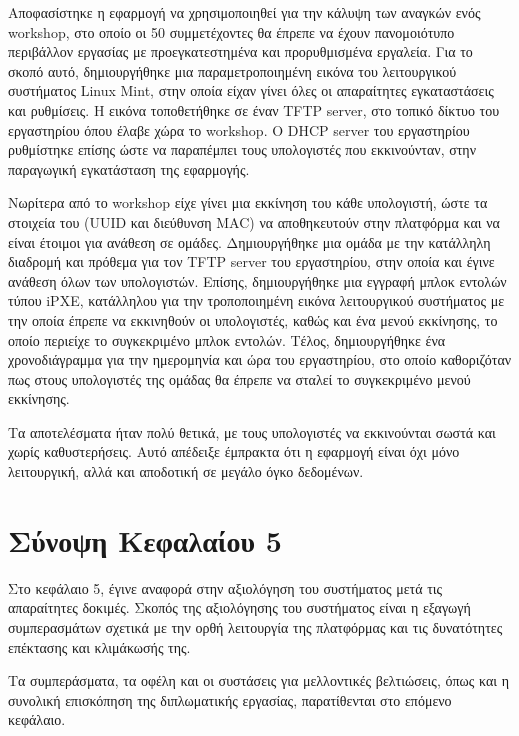 Αποφασίστηκε η εφαρμογή να χρησιμοποιηθεί για την κάλυψη των αναγκών ενός workshop, στο οποίο οι 50 συμμετέχοντες θα έπρεπε να έχουν πανομοιότυπο περιβάλλον εργασίας με προεγκατεστημένα και προρυθμισμένα εργαλεία. Για το σκοπό αυτό, δημιουργήθηκε μια παραμετροποιημένη εικόνα του λειτουργικού συστήματος Linux Mint, στην οποία είχαν γίνει όλες οι απαραίτητες εγκαταστάσεις και ρυθμίσεις. Η εικόνα τοποθετήθηκε σε έναν TFTP server, στο τοπικό δίκτυο του εργαστηρίου όπου έλαβε χώρα το workshop. Ο DHCP server του εργαστηρίου ρυθμίστηκε επίσης ώστε να παραπέμπει τους υπολογιστές που εκκινούνταν, στην παραγωγική εγκατάσταση της εφαρμογής.

Νωρίτερα από το workshop είχε γίνει μια εκκίνηση του κάθε υπολογιστή, ώστε τα στοιχεία του (UUID και διεύθυνση MAC) να αποθηκευτούν στην πλατφόρμα και να είναι έτοιμοι για ανάθεση σε ομάδες. Δημιουργήθηκε μια ομάδα με την κατάλληλη διαδρομή και πρόθεμα για τον TFTP server του εργαστηρίου, στην οποία και έγινε ανάθεση όλων των υπολογιστών. Επίσης, δημιουργήθηκε μια εγγραφή μπλοκ εντολών τύπου iPXE, κατάλληλου για την τροποποιημένη εικόνα λειτουργικού συστήματος με την οποία έπρεπε να εκκινηθούν οι υπολογιστές, καθώς και ένα μενού εκκίνησης, το οποίο περιείχε το συγκεκριμένο μπλοκ εντολών. Τέλος, δημιουργήθηκε ένα χρονοδιάγραμμα για την ημερομηνία και ώρα του εργαστηρίου, στο οποίο καθοριζόταν πως στους υπολογιστές της ομάδας θα έπρεπε να σταλεί το συγκεκριμένο μενού εκκίνησης.

Τα αποτελέσματα ήταν πολύ θετικά, με τους υπολογιστές να εκκινούνται σωστά και χωρίς καθυστερήσεις. Αυτό απέδειξε έμπρακτα ότι η εφαρμογή είναι όχι μόνο λειτουργική, αλλά και αποδοτική σε μεγάλο όγκο δεδομένων.

\section{Σύνοψη Κεφαλαίου 5}
Στο κεφάλαιο 5, έγινε αναφορά στην αξιολόγηση του συστήματος μετά τις απαραίτητες δοκιμές. Σκοπός της αξιολόγησης του συστήματος είναι η εξαγωγή συμπερασμάτων σχετικά με την ορθή λειτουργία της πλατφόρμας και τις δυνατότητες επέκτασης και κλιμάκωσής της.

Τα συμπεράσματα, τα οφέλη και οι συστάσεις για μελλοντικές βελτιώσεις, όπως και η συνολική επισκόπηση της διπλωματικής εργασίας, παρατίθενται στο επόμενο κεφάλαιο.
